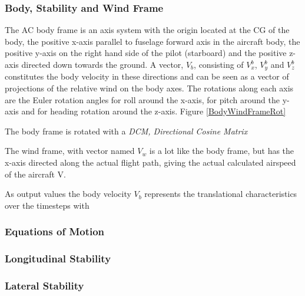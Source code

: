 \subsubsection{Body, Stability and Wind Frame}

The AC body frame is an axis system with the origin located at the CG of the body, the positive x-axis parallel to fuselage forward axis in the aircraft body, the positive y-axis on the right hand side of the pilot (starboard) and the positive z-axis directed down towards the ground. A vector, \textbf{$V_b$}, consisting of $V^b_x$, $V^b_y$ and $V^b_z$ constitutes the body velocity in these directions and can be seen as a vector of projections of the relative wind on the body axes. The rotations along each axis are the Euler rotation angles \phi for roll around the x-axis, \theta for pitch around the y-axis and \psi for heading rotation around the z-axis. Figure \ref{BodyWindFrameRot}


The body frame is rotated with a \textit{DCM, Directional Cosine Matrix}

The wind frame, with vector named \textbf{$V_w$} is a lot like the body frame, but has the x-axis directed along the actual flight path, giving the actual calculated airspeed of the aircraft V.

As output values the body velocity \textbf{$V_b$} represents the translational characteristics over the timesteps with

\subsubsection{Equations of Motion}

\subsubsection{Longitudinal Stability}
\subsubsection{Lateral Stability}




